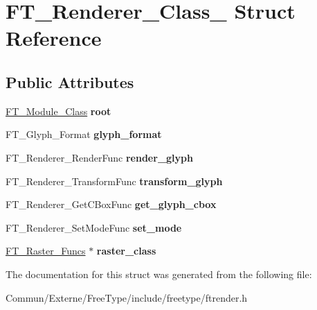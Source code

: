 \hypertarget{struct_f_t___renderer___class__}{}\section{F\+T\+\_\+\+Renderer\+\_\+\+Class\+\_\+ Struct Reference}
\label{struct_f_t___renderer___class__}
\subsection*{Public Attributes}
\begin{DoxyCompactItemize}
\item 
\hyperlink{struct_f_t___module___class__}{F\+T\+\_\+\+Module\+\_\+\+Class} {\bfseries root}\hypertarget{struct_f_t___renderer___class___a3df4509f1de704596bf4237d6ff8cbd4}{}\label{struct_f_t___renderer___class___a3df4509f1de704596bf4237d6ff8cbd4}

\item 
F\+T\+\_\+\+Glyph\+\_\+\+Format {\bfseries glyph\+\_\+format}\hypertarget{struct_f_t___renderer___class___a2c8602452fae27379a6f85bbcb4b525c}{}\label{struct_f_t___renderer___class___a2c8602452fae27379a6f85bbcb4b525c}

\item 
F\+T\+\_\+\+Renderer\+\_\+\+Render\+Func {\bfseries render\+\_\+glyph}\hypertarget{struct_f_t___renderer___class___a7a022b8358ce3a06620c62f3542d0d2b}{}\label{struct_f_t___renderer___class___a7a022b8358ce3a06620c62f3542d0d2b}

\item 
F\+T\+\_\+\+Renderer\+\_\+\+Transform\+Func {\bfseries transform\+\_\+glyph}\hypertarget{struct_f_t___renderer___class___a2aef09ecdabacf5628ef29fb3d179def}{}\label{struct_f_t___renderer___class___a2aef09ecdabacf5628ef29fb3d179def}

\item 
F\+T\+\_\+\+Renderer\+\_\+\+Get\+C\+Box\+Func {\bfseries get\+\_\+glyph\+\_\+cbox}\hypertarget{struct_f_t___renderer___class___a4f9dc9b6d86504a8d3b04b4e72936e76}{}\label{struct_f_t___renderer___class___a4f9dc9b6d86504a8d3b04b4e72936e76}

\item 
F\+T\+\_\+\+Renderer\+\_\+\+Set\+Mode\+Func {\bfseries set\+\_\+mode}\hypertarget{struct_f_t___renderer___class___a7cfd4795107157aad4f7efcab77a0f64}{}\label{struct_f_t___renderer___class___a7cfd4795107157aad4f7efcab77a0f64}

\item 
\hyperlink{struct_f_t___raster___funcs__}{F\+T\+\_\+\+Raster\+\_\+\+Funcs} $\ast$ {\bfseries raster\+\_\+class}\hypertarget{struct_f_t___renderer___class___a5af75b9f582f98f9f74dbcbc530c7e88}{}\label{struct_f_t___renderer___class___a5af75b9f582f98f9f74dbcbc530c7e88}

\end{DoxyCompactItemize}


The documentation for this struct was generated from the following file\+:\begin{DoxyCompactItemize}
\item 
Commun/\+Externe/\+Free\+Type/include/freetype/ftrender.\+h\end{DoxyCompactItemize}
